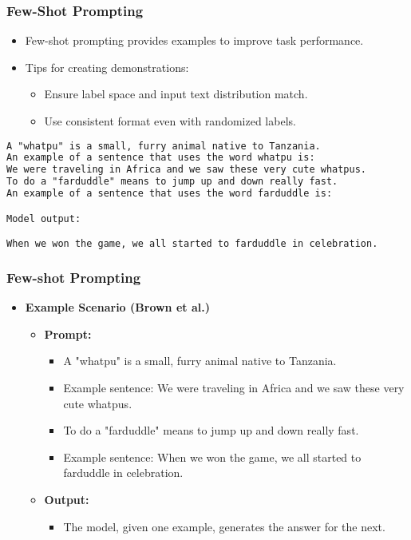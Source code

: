 \begin{frame}[fragile]\frametitle{Few-Shot Prompting}
    \begin{itemize}
        \item Few-shot prompting provides examples to improve task performance.
        \item Tips for creating demonstrations:
        \begin{itemize}
            \item Ensure label space and input text distribution match.
            \item Use consistent format even with randomized labels.
        \end{itemize}
    \end{itemize}
	
        \begin{lstlisting}[language=HTML]
A "whatpu" is a small, furry animal native to Tanzania. 
An example of a sentence that uses the word whatpu is:
We were traveling in Africa and we saw these very cute whatpus.
To do a "farduddle" means to jump up and down really fast. 
An example of a sentence that uses the word farduddle is:

Model output:

When we won the game, we all started to farduddle in celebration.
        \end{lstlisting}

\end{frame}



\begin{frame}[fragile]\frametitle{Few-shot Prompting}

\begin{itemize}

  \item \textbf{Example Scenario (Brown et al.)}
    \begin{itemize}
      \item \textbf{Prompt:}
        \begin{itemize}
          \item A "whatpu" is a small, furry animal native to Tanzania.
          \item Example sentence: We were traveling in Africa and we saw these very cute whatpus.
          \item To do a "farduddle" means to jump up and down really fast.
          \item Example sentence: When we won the game, we all started to farduddle in celebration.
        \end{itemize}
      \item \textbf{Output:}
        \begin{itemize}
          \item The model, given one example, generates the answer for the next.
        \end{itemize}
    \end{itemize}
\end{itemize}

\end{frame}


